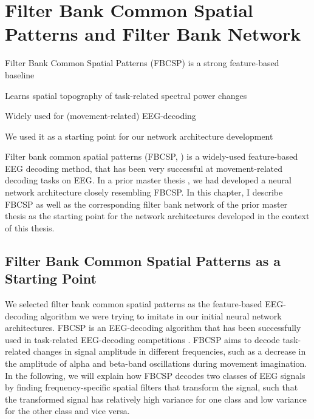 \chapter{Filter Bank Common Spatial Patterns and
Filter Bank Network}\label{fbscp-and-filterbank-net}

\begin{startbox}{Filter Bank Common Spatial Patterns (FBCSP) is a strong feature-based baseline}
\item Learns spatial topography of task-related spectral power changes
\item Widely used for (movement-related) EEG-decoding
\item We used it as a starting point for our network architecture development
\end{startbox}



Filter bank common spatial patterns (FBCSP, \cite{ang_filter_2008,chin_multi-class_2009}) is a widely-used  feature-based EEG decoding method, that has been very successful at movement-related decoding tasks on EEG. In a prior master thesis
\citep{schirrmeister_msc_thesis_2015}, we had developed a
neural network architecture closely resembling FBCSP. In this chapter,
I describe FBCSP as well as the
corresponding filter bank network of the prior master thesis as the
starting point for the network architectures developed in the context of
this thesis.

\section{Filter Bank Common Spatial Patterns as a Starting
Point}\label{filter-bank-common-spatial-patterns-as-a-starting-point}


We selected filter bank common spatial patterns 
\cite{ang_filter_2008,chin_multi-class_2009} as the
feature-based EEG-decoding algorithm we were trying to imitate in our
initial neural network architectures. FBCSP is an EEG-decoding algorithm
that has been successfully used in task-related EEG-decoding
competitions \cite{tangermann_review_2012}. FBCSP aims to
decode task-related changes in signal amplitude in different
frequencies, such as a decrease in the amplitude of alpha and beta-band
oscillations during movement imagination. In the following, we will
explain how FBCSP decodes two classes of EEG signals by finding
frequency-specific spatial filters that transform the signal, such that
the transformed signal has relatively high variance for one class and low variance for the
other class and vice versa.


